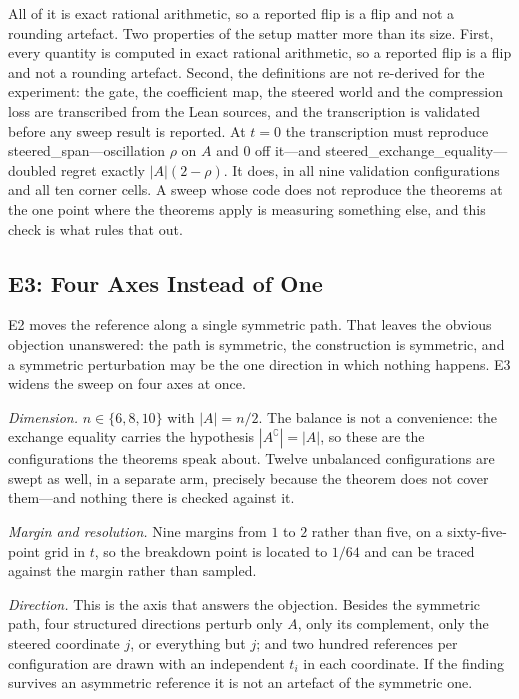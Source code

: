 \documentclass[conference]{IEEEtran}
\theoremstyle{definition}
\newcommand{\lean}[1]{\textsf{\footnotesize #1}}
\begin{document}
\noindent All of it is exact rational arithmetic, so a reported flip is a flip and not a
rounding artefact. Two properties of the setup matter more than its size. First, every quantity is computed in
exact rational arithmetic, so a reported flip is a flip and not a rounding artefact. Second,
the definitions are not re-derived for the experiment: the gate, the coefficient map, the
steered world and the compression loss are transcribed from the Lean sources, and the
transcription is validated before any sweep result is reported. At $t=0$ the transcription
must reproduce \lean{steered\_span}---oscillation $\rho$ on $A$ and $0$ off it---and
\lean{steered\_exchange\_equality}---doubled regret exactly $|A|(2-\rho)$. It does, in all
nine validation configurations and all ten corner cells. A sweep whose code does not
reproduce the theorems at the one point where the theorems apply is measuring something else,
and this check is what rules that out.

\subsection{E3: Four Axes Instead of One}
\label{sec:e3}

E2 moves the reference along a single symmetric path. That leaves the obvious objection
unanswered: the path is symmetric, the construction is symmetric, and a symmetric
perturbation may be the one direction in which nothing happens. E3 widens the sweep on four
axes at once.

\emph{Dimension.} $n\in\{6,8,10\}$ with $|A|=n/2$. The balance is not a convenience: the
exchange equality carries the hypothesis $|A^{\complement}|=|A|$, so these are the
configurations the theorems speak about. Twelve unbalanced configurations are swept as well,
in a separate arm, precisely because the theorem does not cover them---and nothing there is
checked against it.

\emph{Margin and resolution.} Nine margins from $1$ to $2$ rather than five, on a
sixty-five-point grid in $t$, so the breakdown point is located to $1/64$ and can be traced
against the margin rather than sampled.

\emph{Direction.} This is the axis that answers the objection. Besides the symmetric path,
four structured directions perturb only $A$, only its complement, only the steered coordinate
$j$, or everything but $j$; and two hundred references per configuration are drawn with an
independent $t_{i}$ in each coordinate. If the finding survives an asymmetric reference it is
not an artefact of the symmetric one.
\end{document}
